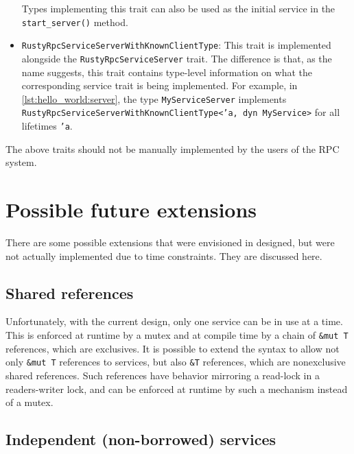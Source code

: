 \documentclass[11pt, twocolumn]{article}
\begin{document}
\begin{itemize}
    Types implementing this trait can also be used as the initial service in the \texttt{start\_server()} method.
    
    \item \texttt{RustyRpcServiceServerWithKnownClient\linebreak[0]Type}: This trait is implemented alongside the \texttt{RustyRpcServiceServer} trait. The difference is that, as the name suggests, this trait contains type-level information on what the corresponding service trait is being implemented. For example, in \ref{lst:hello_world:server}, the type \texttt{MyServiceServer} implements \texttt{RustyRpcServiceServerWithKnownClient\linebreak[0]Type\linebreak[0]<'a, dyn MyService>} for all lifetimes \texttt{'a}.
\end{itemize}

The above traits should not be manually implemented by the users of the RPC system.

\section{Possible future extensions}

There are some possible extensions that were envisioned in designed, but were not actually implemented due to time constraints. They are discussed here.

\subsection{Shared references} \label{sec:ext:shared-refs}

Unfortunately, with the current design, only one service can be in use at a time. This is enforced at runtime by a mutex and at compile time by a chain of \texttt{\&mut T} references, which are exclusives. It is possible to extend the syntax to allow not only \texttt{\&mut T} references to services, but also \texttt{\&T} references, which are nonexclusive shared references. Such references have behavior mirroring a read-lock in a readers-writer lock, and can be enforced at runtime by such a mechanism instead of a mutex.

\subsection{Independent (non-borrowed) services} \label{sec:ext:independent-services}
\end{document}
